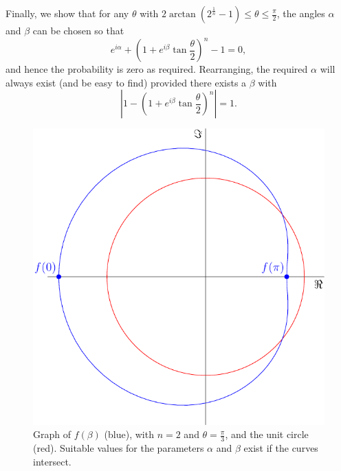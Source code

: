 \documentclass[amsmath,amssymb,superscriptaddress,pra,12pt]{revtex4-1}
\newcommand{\abs}[1]{\left\lvert{#1}\right\rvert}
\begin{document}
Finally, we show that for any $\theta$ with $2\arctan\left(2^\frac{1}{n} - 1\right) \leq \theta \leq \frac\pi2$, the angles $\alpha$ and $\beta$ can be chosen so that
\begin{equation}
e^{i\alpha} + \left(1+e^{i\beta}\tan\frac\theta2\right)^n - 1 = 0,
\end{equation}
and hence the probability is zero as required.
Rearranging, the required $\alpha$ will always exist (and be easy to find) provided there exists a $\beta$ with
\begin{equation}
  \abs{1 - \left(1+e^{i\beta}\tan\frac\theta2\right)^n} = 1.\label{betaeq}
\end{equation}
\begin{figure}
  \begin{center}
\includegraphics[scale=0.7]{figs/curve}
  \end{center}
  \caption{Graph of $f(\beta)$ (blue), with $n=2$ and $\theta=\frac\pi3$, and the unit circle (red). Suitable values for the parameters $\alpha$ and $\beta$ exist if the curves intersect.}
  \label{curve}
\end{figure}
\end{document}
